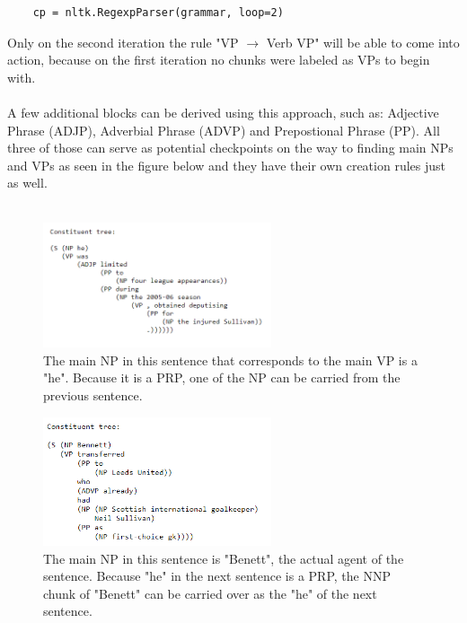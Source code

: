\documentclass{article}
\begin{document}
\begin{verbatim}
    cp = nltk.RegexpParser(grammar, loop=2)
\end{verbatim}
Only on the second iteration the rule "VP $\rightarrow$ Verb VP" will be able to come into action, because on the first iteration no chunks were labeled as VPs to begin with. \\ \\
A few additional blocks can be derived using this approach, such as: Adjective Phrase (ADJP), Adverbial Phrase (ADVP) and Prepostional Phrase (PP)\cite{CFG for PP etc.}. All three of those can serve as potential checkpoints on the way to finding main NPs and VPs as seen in the figure below and they have their own creation rules just as well. \\ \\
\begin{figure}[htb!]
    \centering
\includegraphics[width=0.6\textwidth]{NPsvsVPs.png}
    \caption{The main NP in this sentence that corresponds to the main VP is a "he". Because it is a PRP, one of the NP can be carried from the previous sentence.}
\end{figure}
\begin{figure}[htb!]
    \centering
\includegraphics[width=0.6\textwidth]{NPsvsVPs2.png}
    \caption{The main NP in this sentence is "Benett", the actual agent of the sentence. Because "he" in the next sentence is a PRP, the NNP chunk of "Benett" can be carried over as the "he" of the next sentence.}
\end{figure}
\end{document}
